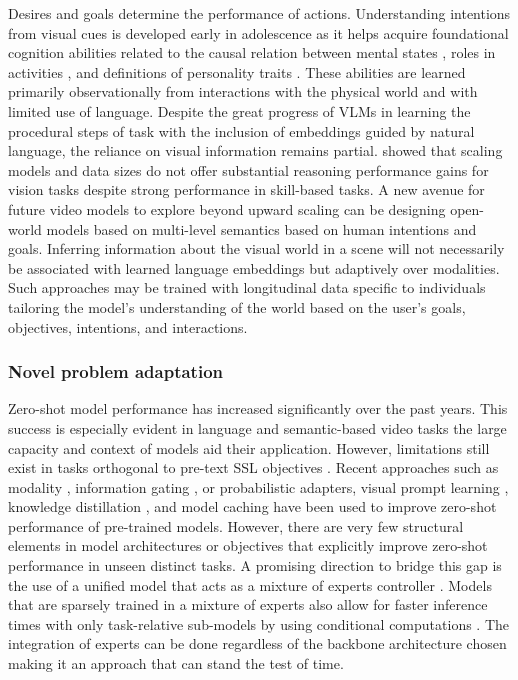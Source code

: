 Desires and goals determine the performance of actions. Understanding intentions from visual cues is developed early in adolescence \citep{flavell1999cognitive} as it helps acquire foundational cognition abilities related to the causal relation between mental states \citep{flavell1998social}, roles in activities \citep{woodward2009infants}, and definitions of personality traits \citep{nelson1980factors}. These abilities are learned primarily observationally from interactions with the physical world and with limited use of language. Despite the great progress of VLMs in learning the procedural steps of task \citep{li2025llama,li2024mini,wu2024longvideobench} with the inclusion of embeddings guided by natural language, the reliance on visual information remains partial. \citet{al2024unibench} showed that scaling models and data sizes do not offer substantial reasoning performance gains for vision tasks despite strong performance in skill-based tasks. A new avenue for future video models to explore beyond upward scaling can be designing open-world models based on multi-level semantics based on human intentions and goals. Inferring information about the visual world in a scene will not necessarily be associated with learned language embeddings but adaptively over modalities. Such approaches may be trained with longitudinal data specific to individuals tailoring the model's understanding of the world based on the user's goals, objectives, intentions, and interactions.



\subsubsection{Novel problem adaptation}

Zero-shot model performance has increased significantly over the past years. This success is especially evident in language and semantic-based video tasks the large capacity and context of models aid their application. However, limitations still exist in tasks orthogonal to pre-text SSL objectives \citep{liu2024mmbench}. Recent approaches such as modality \citep{lin2023vision,sung2022vl}, information gating \citep{zhang2024llama}, or probabilistic \citep{upadhyay2023probvlm} adapters, visual prompt learning \citep{khattak2023maple}, knowledge distillation \citep{mistretta2024improving}, and model caching \citep{zhang2021tip} have been used to improve zero-shot performance of pre-trained models. However, there are very few structural elements in model architectures or objectives that explicitly improve zero-shot performance in unseen distinct tasks. A promising direction to bridge this gap is the use of a unified model that acts as a mixture of experts controller  \citep{bao2022vlmo,lin2024moe,wang2022image,yu2024boosting}. Models that are sparsely trained in a mixture of experts also allow for faster inference times with only task-relative sub-models by using conditional computations \citep{bengio2013estimating,jacobs1991adaptive}. The integration of experts can be done regardless of the backbone architecture chosen making it an approach that can stand the test of time.

